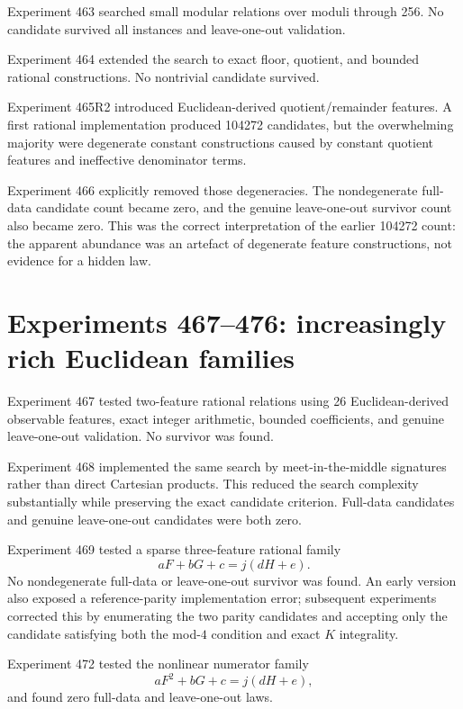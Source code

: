 \documentclass[11pt,a4paper]{article}
\begin{document}
Experiment 463 searched small modular relations over moduli through 256. No candidate survived all instances and leave-one-out validation.

Experiment 464 extended the search to exact floor, quotient, and bounded rational constructions. No nontrivial candidate survived.

Experiment 465R2 introduced Euclidean-derived quotient/remainder features. A first rational implementation produced 104272 candidates, but the overwhelming majority were degenerate constant constructions caused by constant quotient features and ineffective denominator terms.

Experiment 466 explicitly removed those degeneracies. The nondegenerate full-data candidate count became zero, and the genuine leave-one-out survivor count also became zero. This was the correct interpretation of the earlier 104272 count: the apparent abundance was an artefact of degenerate feature constructions, not evidence for a hidden law.

\section{Experiments 467--476: increasingly rich Euclidean families}

Experiment 467 tested two-feature rational relations using 26 Euclidean-derived observable features, exact integer arithmetic, bounded coefficients, and genuine leave-one-out validation. No survivor was found.

Experiment 468 implemented the same search by meet-in-the-middle signatures rather than direct Cartesian products. This reduced the search complexity substantially while preserving the exact candidate criterion. Full-data candidates and genuine leave-one-out candidates were both zero.

Experiment 469 tested a sparse three-feature rational family
\begin{equation}
aF+bG+c=j(dH+e).
\end{equation}
No nondegenerate full-data or leave-one-out survivor was found. An early version also exposed a reference-parity implementation error; subsequent experiments corrected this by enumerating the two parity candidates and accepting only the candidate satisfying both the mod-$4$ condition and exact $K$ integrality.

Experiment 472 tested the nonlinear numerator family
\begin{equation}
aF^2+bG+c=j(dH+e),
\end{equation}
and found zero full-data and leave-one-out laws.
\end{document}
